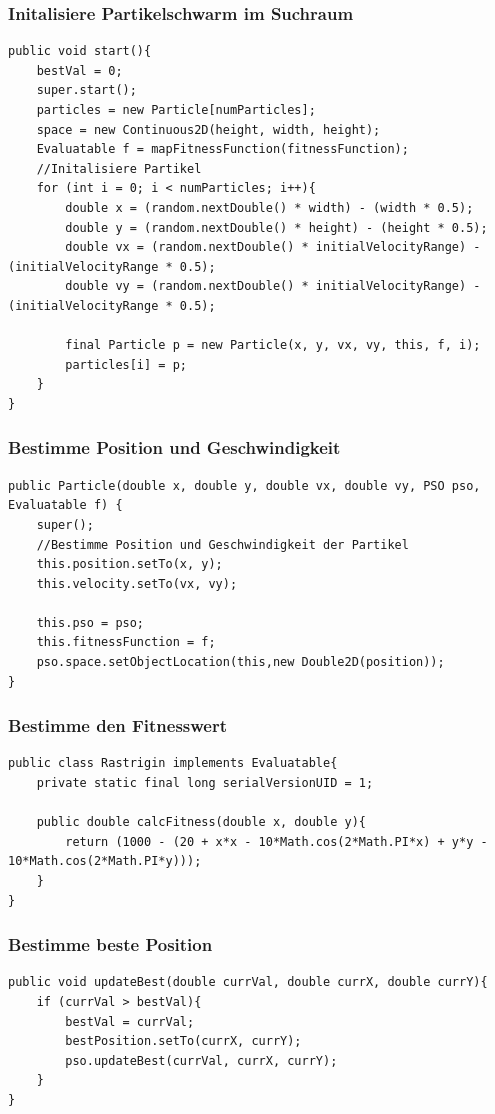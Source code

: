 \documentclass[a4paper, 11pt]{article}
\newcounter{pos}
\begin{document}
\subsubsection{Initalisiere Partikelschwarm im Suchraum}
\begin{lstlisting}[caption= xxxxxxx,label = xxxx]
public void start(){
	bestVal = 0;
	super.start();
	particles = new Particle[numParticles];
	space = new Continuous2D(height, width, height);
	Evaluatable f = mapFitnessFunction(fitnessFunction);            
	//Initalisiere Partikel
	for (int i = 0; i < numParticles; i++){
		double x = (random.nextDouble() * width) - (width * 0.5);
		double y = (random.nextDouble() * height) - (height * 0.5);
		double vx = (random.nextDouble() * initialVelocityRange) - (initialVelocityRange * 0.5);
		double vy = (random.nextDouble() * initialVelocityRange) - (initialVelocityRange * 0.5);

		final Particle p = new Particle(x, y, vx, vy, this, f, i);
		particles[i] = p;
	}
}
\end{lstlisting}
\subsubsection{Bestimme Position und Geschwindigkeit}
\begin{lstlisting}[caption= xxxxxxx,label = xxxx]
public Particle(double x, double y, double vx, double vy, PSO pso, Evaluatable f) {
	super();
	//Bestimme Position und Geschwindigkeit der Partikel
	this.position.setTo(x, y);
	this.velocity.setTo(vx, vy);

	this.pso = pso;
	this.fitnessFunction = f;
	pso.space.setObjectLocation(this,new Double2D(position));
}
\end{lstlisting}
\subsubsection{Bestimme den Fitnesswert}
\begin{lstlisting}[caption= xxxxxxx,label = xxxx]
public class Rastrigin implements Evaluatable{
	private static final long serialVersionUID = 1;

	public double calcFitness(double x, double y){
		return (1000 - (20 + x*x - 10*Math.cos(2*Math.PI*x) + y*y - 10*Math.cos(2*Math.PI*y)));
	}
}
\end{lstlisting}
\subsubsection{Bestimme beste Position} 
\begin{lstlisting}[caption= xxxxxxx,label = xxxx]
public void updateBest(double currVal, double currX, double currY){
	if (currVal > bestVal){
		bestVal = currVal;
		bestPosition.setTo(currX, currY);
		pso.updateBest(currVal, currX, currY);
	}
}
\end{lstlisting}
\end{document}
